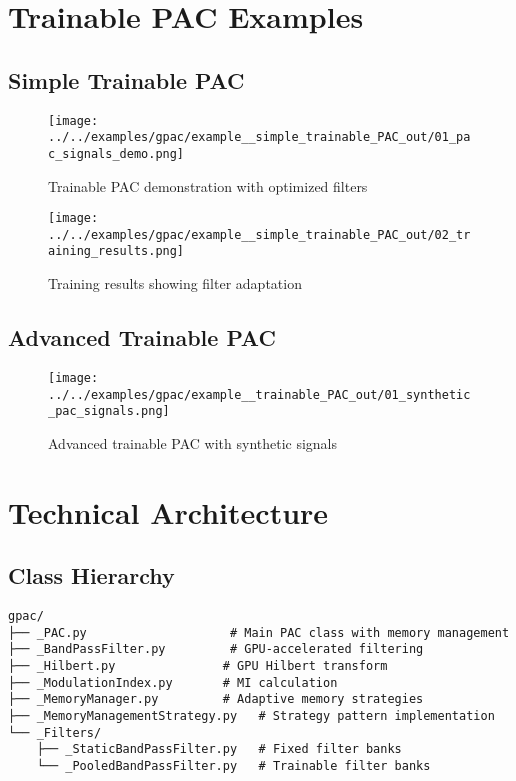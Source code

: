 \documentclass[11pt,a4paper]{article}
\begin{document}
\section{Trainable PAC Examples}
\label{sec:org718271c}

\subsection{Simple Trainable PAC}
\label{sec:orgbc3539c}

\begin{figure}[htbp]
\centering
\texttt{[image: ../../examples/gpac/example\_\_simple\_trainable\_PAC\_out/01\_pac\_signals\_demo.png]}
\caption{\label{fig:orgb1c7e10}Trainable PAC demonstration with optimized filters}
\end{figure}

\begin{figure}[htbp]
\centering
\texttt{[image: ../../examples/gpac/example\_\_simple\_trainable\_PAC\_out/02\_training\_results.png]}
\caption{\label{fig:orgc885b27}Training results showing filter adaptation}
\end{figure}

\subsection{Advanced Trainable PAC}
\label{sec:org407404d}

\begin{figure}[htbp]
\centering
\texttt{[image: ../../examples/gpac/example\_\_trainable\_PAC\_out/01\_synthetic\_pac\_signals.png]}
\caption{\label{fig:org99d9519}Advanced trainable PAC with synthetic signals}
\end{figure}

\section{Technical Architecture}
\label{sec:orge2b4c92}

\subsection{Class Hierarchy}
\label{sec:orgf1c7aa7}

\begin{verbatim}
gpac/
├── _PAC.py                    # Main PAC class with memory management
├── _BandPassFilter.py         # GPU-accelerated filtering
├── _Hilbert.py               # GPU Hilbert transform
├── _ModulationIndex.py       # MI calculation
├── _MemoryManager.py         # Adaptive memory strategies
├── _MemoryManagementStrategy.py   # Strategy pattern implementation
└── _Filters/
    ├── _StaticBandPassFilter.py   # Fixed filter banks
    └── _PooledBandPassFilter.py   # Trainable filter banks
\end{verbatim}
\end{document}
